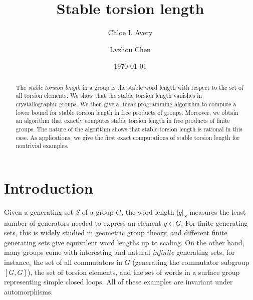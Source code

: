 \documentclass{amsart}
\title{Stable torsion length}
\author{Chloe I. Avery}
\author{Lvzhou Chen}
\date{\today}
\theoremstyle{definition}
\numberwithin{equation}{section}
\theoremstyle{theorem}
\theoremstyle{remark}
\begin{document}
	
	\begin{abstract}
	    The \emph{stable torsion length} in a group is the stable word length with respect to the set of all torsion elements. We show that the stable torsion length vanishes in crystallographic groups. We then give a linear programming algorithm to compute a lower bound for stable torsion length in free products of groups. Moreover, we obtain an algorithm that exactly computes stable torsion length in free products of finite groups. The nature of the algorithm shows that stable torsion length is rational in this case. As applications, we give the first exact computations of stable torsion length for nontrivial examples. 
		
	\end{abstract}
	
	\maketitle
	
	\setcounter{tocdepth}{1}
	\tableofcontents
	
	\section{Introduction}
	Given a generating set $S$ of a group $G$, the word length $|g|_S$ measures the least number of generators needed to express an element $g\in G$. 
	For finite generating sets, this is widely studied in geometric group theory, and different finite generating sets give equivalent word lengths up to scaling.
	On the other hand, many groups come with interesting and natural \emph{infinite} generating sets, for instance, the set of all commutators in $G$ (generating the commutator subgroup $[G,G]$), the set of torsion elements, and the set of words in a surface group representing simple closed loops. All of these examples are invariant under automorphisms.
	
\end{document}

